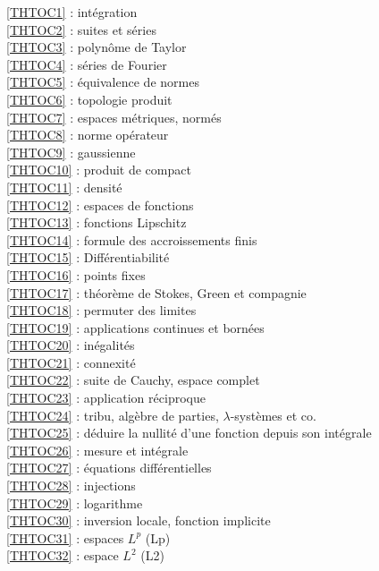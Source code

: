 \ref {THTOC1} : intégration\\
\ref {THTOC2} : suites et séries\\
\ref {THTOC3} : polynôme de Taylor\\
\ref {THTOC4} : séries de Fourier\\
\ref {THTOC5} : équivalence de normes\\
\ref {THTOC6} : topologie produit\\
\ref {THTOC7} : espaces métriques, normés\\
\ref {THTOC8} : norme opérateur\\
\ref {THTOC9} : gaussienne\\
\ref {THTOC10} : produit de compact\\
\ref {THTOC11} : densité\\
\ref {THTOC12} : espaces de fonctions\\
\ref {THTOC13} : fonctions Lipschitz\\
\ref {THTOC14} : formule des accroissements finis\\
\ref {THTOC15} : Différentiabilité\\
\ref {THTOC16} : points fixes\\
\ref {THTOC17} : théorème de Stokes, Green et compagnie\\
\ref {THTOC18} : permuter des limites\\
\ref {THTOC19} : applications continues et bornées\\
\ref {THTOC20} : inégalités\\
\ref {THTOC21} : connexité\\
\ref {THTOC22} : suite de Cauchy, espace complet\\
\ref {THTOC23} : application réciproque\\
\ref {THTOC24} : tribu, algèbre de parties, \( \lambda \)-systèmes et co.\\
\ref {THTOC25} : déduire la nullité d'une fonction depuis son intégrale\\
\ref {THTOC26} : mesure et intégrale\\
\ref {THTOC27} : équations différentielles\\
\ref {THTOC28} : injections\\
\ref {THTOC29} : logarithme\\
\ref {THTOC30} : inversion locale, fonction implicite\\
\ref {THTOC31} : espaces \( L^p\) (Lp)\\
\ref {THTOC32} : espace \( L^2\) (L2)\\
